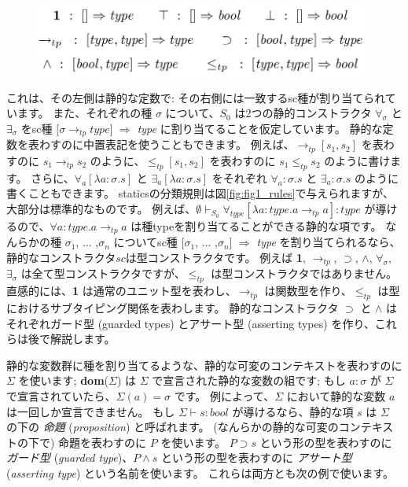 \documentclass[submit,techreq,noauthor,onecolumn]{ipsj}
\begin{document}
\begin{figure}[h]
\centering
\includegraphics[width=11cm]{img/infig21_initialsig.png}
\end{figure}

\noindent これは、その左側は静的な定数で: その右側には一致するsc種が割り当てられています。
また、それぞれの種 $\sigma$ について、$S_0$ は2つの静的コンストラクタ $\forall_\sigma$ と $\exists_\sigma$ をsc種 [$\sigma \rightarrow_{tp} type$] $\Rightarrow$ {\it type} に割り当てることを仮定しています。
静的な定数を表わすのに中置表記を使うこともできます。
例えば、$\rightarrow_{tp} [s_1,s_2]$ を表わすのに $s_1 \rightarrow_{tp} s_2$ のように、$\leq_{tp} [s_1,s_2]$ を表わすのに $s_1 \leq_{tp} s_2$ のように書けます。
さらに、$\forall_a [\lambda a : \sigma.s]$ と $\exists_a [\lambda a : \sigma.s]$ をそれぞれ $\forall_a : \sigma.s$ と $\exists_a : \sigma.s$ のように書くこともできます。
staticsの分類規則は図\ref{fig:fig1_rules}で与えられますが、大部分は標準的なものです。
例えば、$\emptyset \vdash_{S_0} \forall_{type} [\lambda a : type.a \rightarrow_{tp} a] : type$ が導けるので、$\forall a : type.a \rightarrow_{tp} a$ は種typeを割り当てることができる静的な項です。
なんらかの種 $\sigma_1$, $\ldots$ ,$\sigma_n$ についてsc種 [$\sigma_1$, $\ldots$ ,$\sigma_n$] $\Rightarrow$ {\it type} を割り当てられるなら、静的なコンストラクタ$sc$は型コンストラクタです。
例えば {\bf 1}, $\rightarrow_{tp}$, $\supset$, $\wedge$, $\forall_\sigma$, $\exists_\sigma$ は全て型コンストラクタですが、$\leq_{tp}$ は型コンストラクタではありません。
直感的には、{\bf 1} は通常のユニット型を表わし、$\rightarrow_{tp}$ は関数型を作り、$\leq_{tp}$ は型におけるサブタイピング関係を表わします。
静的なコンストラクタ $\supset$ と $\wedge$ はそれぞれガード型 (guarded types) とアサート型 (asserting types) を作り、これらは後で解説します。

静的な変数群に種を割り当てるような、静的な可変のコンテキストを表わすのに $\Sigma$ を使います;
{\bf dom}($\Sigma$) は $\Sigma$ で宣言された静的な変数の組です;
もし $a : \sigma$ が $\Sigma$ で宣言されていたら、$\Sigma (a) = \sigma$ です。
例によって、$\Sigma$ において静的な変数 $a$ は一回しか宣言できません。
もし $\Sigma \vdash s : bool$ が導けるなら、静的な項 $s$ は $\Sigma$ の下の {\it 命題} ({\it proposition}) と呼ばれます。
(なんらかの静的な可変のコンテキストの下で) 命題を表わすのに $P$ を使います。
$P \supset s$ という形の型を表わすのに {\it ガード型} ({\it guarded type})、$P \wedge s$ という形の型を表わすのに {\it アサート型} ({\it asserting type}) という名前を使います。
これらは両方とも次の例で使います。
\end{document}

